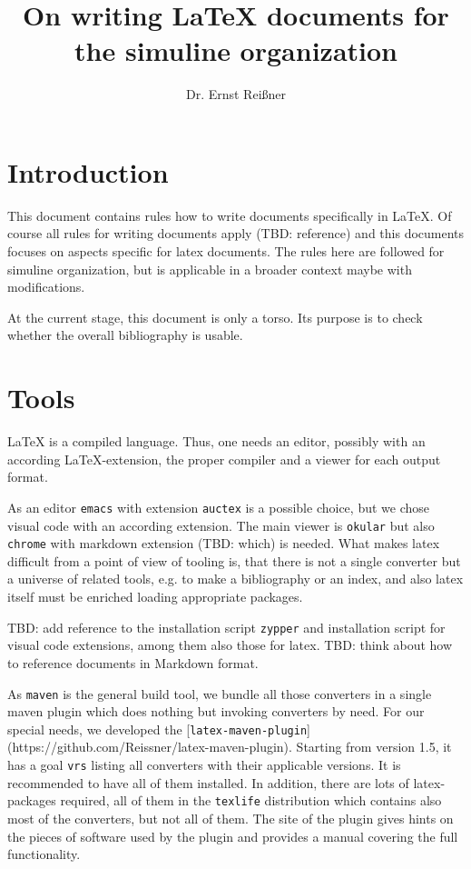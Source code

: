 \documentclass[12pt]{article}
\begin{document}
\title{On writing \LaTeX{} documents for the simuline organization}
\author{Dr. Ernst Reißner}
\maketitle


\newpage

\tableofcontents %
\listoffigures
\listoftables

\section{Introduction}

This document contains rules how to write documents specifically in \LaTeX. 
Of course all rules for writing documents apply (TBD: reference) 
and this documents focuses on aspects specific for latex documents. 
The rules here are followed for simuline organization, 
but is applicable in a broader context maybe with modifications. 

At the current stage, this document is only a torso. 
Its purpose is to check whether the overall bibliography is usable. 


\section{Tools}\label{sec:tools}

\LaTeX{} is a compiled language. 
Thus, one needs an editor, possibly with an according \LaTeX-extension, 
the proper compiler and a viewer for each output format. 

As an editor \texttt{emacs} with extension \texttt{auctex} 
is a possible choice, but we chose visual code with an according extension. 
The main viewer is \texttt{okular} but also \texttt{chrome} with markdown extension (TBD: which) 
is needed. 
What makes latex difficult from a point of view of tooling is, 
that there is not a single converter but a universe of related tools, 
e.g. to make a bibliography or an index, 
and also latex itself must be enriched loading appropriate packages. 

TBD: add reference to the installation script \texttt{zypper} 
and installation script for visual code extensions, among them also those for latex. 
TBD: think about how to reference documents in Markdown format. 


As \texttt{maven} is the general build tool, we bundle all those converters 
in a single maven plugin which does nothing but invoking converters by need. 
For our special needs, we developed the 
[\texttt{latex-maven-plugin}](https://github.com/Reissner/latex-maven-plugin). 
Starting from version 1.5, it has a goal \texttt{vrs} listing all converters 
with their applicable versions. 
It is recommended to have all of them installed. 
In addition, there are lots of latex-packages required, 
all of them in the \texttt{texlife} distribution 
which contains also most of the converters, but not all of them. 
The site of the plugin gives hints on the pieces of software used by the plugin 
and provides a manual covering the full functionality. 
\end{document}
